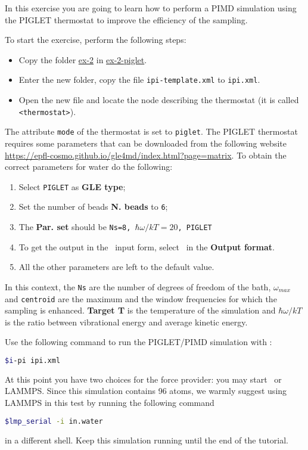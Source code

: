 \documentclass{article}
\begin{document}
\begin{Exercise}[label={inputs},title={Liquid water with the
    \emph{PIGLET} thermostat}]
In this exercise you are going to learn how to perform a PIMD
simulation using the PIGLET thermostat to improve the efficiency of
the sampling.

\Question
To start the exercise, perform the following steps:
\begin{itemize}
\item Copy the folder \url{ex-2} in \url{ex-2-piglet}.
\item  Enter the new folder, copy the file \texttt{ipi-template.xml}
  to \texttt{ipi.xml}. 
\item Open the new file and locate the node describing the
  thermostat (it is called \texttt{<thermostat>}).
\end{itemize}
The attribute \texttt{mode} of the
thermostat is set to \texttt{piglet}. The PIGLET thermostat requires
some parameters that can be downloaded from the following website
\url{https://epfl-cosmo.github.io/gle4md/index.html?page=matrix}.
To obtain the correct parameters for water do the following:
\begin{enumerate}
\item Select \texttt{PIGLET} as \textbf{GLE type};
\item Set the number of beads \textbf{N. beads} to \texttt{6};
\item The \textbf{Par. set} should be \texttt{Ns=8,
    $\hbar\omega/kT=20$, PIGLET}
\item To get the output in the \ipi\ input form, select \ipi\ in the
  \textbf{Output format}.
\item All the other parameters are left to the default value.
\end{enumerate}
In this context, the \texttt{Ns} are the number of degrees of freedom
of the bath, $\omega_{max}$ and \texttt{centroid} are the maximum
and the window frequencies for which the sampling is
enhanced. \textbf{Target T} is the temperature of the simulation and
$\hbar\omega/kT$ is the ratio between vibrational energy and average
kinetic energy.

\Question 
Use the following command to run the PIGLET/PIMD simulation with
\ipi:
\begin{lstlisting}[language=bash]
$i-pi ipi.xml
\end{lstlisting}%

At this point you have two choices for the force provider: you may start
\PWscf\ or LAMMPS. Since this simulation contains 96 atoms, we warmly
suggest using LAMMPS in this test by running the following command
\begin{lstlisting}[language=bash]
$lmp_serial -i in.water
\end{lstlisting}%
in a different shell. Keep this simulation running until the end of
the tutorial.


\end{Exercise}
\end{document}
